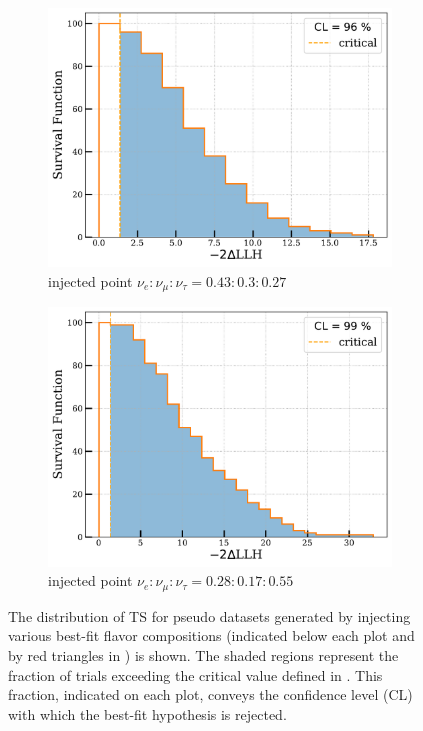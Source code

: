 \begin{figure}[hbt!]
\medskip %
\begin{subfigure}{.7\textwidth}
    \includegraphics[width=\linewidth]{./figures/results/96_distribution.pdf}
    \caption{injected point $\nu_e:\nu_{\mu}:\nu_{\tau} = 0.43:0.3:0.27$}
\end{subfigure}\hfill %
\begin{subfigure}{.7\textwidth}
    \includegraphics[width=\linewidth]{./figures/results/99_distribution.pdf}
    \caption{injected point $\nu_e:\nu_{\mu}:\nu_{\tau} = 0.28:0.17:0.55$}
\end{subfigure}

\caption[The distribution of TS for pseudo datasets generated by injecting various best-fit flavor compositions (indicated below each plot and by red triangles in )]{The distribution of TS for pseudo datasets generated by injecting various best-fit flavor compositions (indicated below each plot and by red triangles in ) is shown. The shaded regions represent the fraction of trials exceeding the critical value defined in . This fraction, indicated on each plot, conveys the confidence level (CL) with which the best-fit hypothesis is rejected.}
\end{figure}


